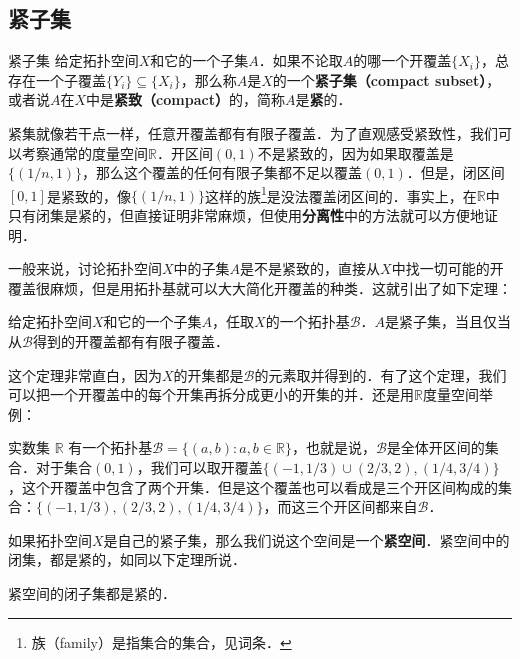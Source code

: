 \subsection{紧子集}

\begin{definition}{紧子集}\label{Topo2_def1}
给定拓扑空间$X$和它的一个子集$A$．如果不论取$A$的哪一个开覆盖$\{X_i\}$，总存在一个子覆盖$\{Y_i\}\subseteq \{X_i\}$，那么称$A$是$X$的一个\textbf{紧子集（compact subset）}，或者说$A$在$X$中是\textbf{紧致（compact）}的，简称$A$是\textbf{紧}的．
\end{definition}

紧集就像若干点一样，任意开覆盖都有有限子覆盖．为了直观感受紧致性，我们可以考察通常的度量空间$\mathbb{R}$．开区间$(0,1)$不是紧致的，因为如果取覆盖是$\{(1/n, 1)\}$，那么这个覆盖的任何有限子集都不足以覆盖$(0, 1)$．但是，闭区间$[0,1]$是紧致的，像$\{(1/n, 1)\}$这样的族\footnote{族（family）是指集合的集合，见词条．}是没法覆盖闭区间的．事实上，在$\mathbb{R}$中只有闭集是紧的，但直接证明非常麻烦，但使用\textbf{分离性}中的方法就可以方便地证明．

一般来说，讨论拓扑空间$X$中的子集$A$是不是紧致的，直接从$X$中找一切可能的开覆盖很麻烦，但是用拓扑基就可以大大简化开覆盖的种类．这就引出了如下定理：

\begin{theorem}{}\label{Topo2_the1}
给定拓扑空间$X$和它的一个子集$A$，任取$X$的一个拓扑基$\mathcal{B}$．$A$是紧子集，当且仅当从$\mathcal{B}$得到的开覆盖都有有限子覆盖．
\end{theorem}

这个定理非常直白，因为$X$的开集都是$\mathcal{B}$的元素取并得到的．有了这个定理，我们可以把一个开覆盖中的每个开集再拆分成更小的开集的并．还是用$\mathbb{R}$度量空间举例：

\begin{example}{}\label{Topo2_ex1}
实数集 $\mathbb{R}$ 有一个拓扑基$\mathcal{B}=\{(a,b):a,b\in \mathbb{R}\}$，也就是说，$\mathcal{B}$是全体开区间的集合．对于集合$(0,1)$，我们可以取开覆盖$\{(-1,1/3)\cup(2/3,2), (1/4, 3/4)\}$，这个开覆盖中包含了两个开集．但是这个覆盖也可以看成是三个开区间构成的集合：$\{(-1,1/3), (2/3,2), (1/4, 3/4)\}$，而这三个开区间都来自$\mathcal{B}$．

\end{example}

如果拓扑空间$X$是自己的紧子集，那么我们说这个空间是一个\textbf{紧空间}．紧空间中的闭集，都是紧的，如同以下定理所说．

\begin{theorem}{}\label{Topo2_the2}
紧空间的闭子集都是紧的．
\end{theorem}

